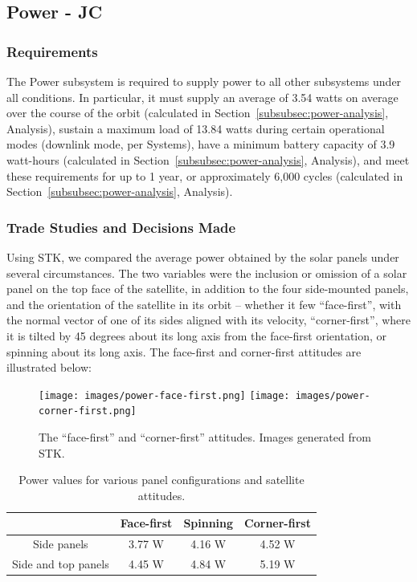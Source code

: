\documentclass[12pt]{article}
\begin{document}
			
		\subsection{Power - JC}
			\subsubsection{Requirements}
			The Power subsystem is required to supply power to all other subsystems under all conditions.  In particular, it must supply an average of 3.54 watts on average over the course of the orbit (calculated in Section~\ref{subsubsec:power-analysis}, Analysis), sustain a maximum load of 13.84 watts during certain operational modes (downlink mode, per Systems), have a minimum battery capacity of 3.9 watt-hours (calculated in Section~\ref{subsubsec:power-analysis}, Analysis), and meet these requirements for up to 1 year, or approximately 6,000 cycles (calculated in Section~\ref{subsubsec:power-analysis}, Analysis).
			
			\subsubsection{Trade Studies and Decisions Made}
			Using STK, we compared the average power obtained by the solar panels under several circumstances.  The two variables were the inclusion or omission of a solar panel on the top face of the satellite, in addition to the four side-mounted panels, and the orientation of the satellite in its orbit -- whether it few ``face-first'', with the normal vector of one of its sides aligned with its velocity, ``corner-first'', where it is tilted by 45 degrees about its long axis from the face-first orientation, or spinning about its long axis.  The face-first and corner-first attitudes are illustrated below:
			
			\begin{figure}[ht]%
			\centering
			\texttt{[image: images/power-face-first.png]}%
			\hspace{0.5in}
			\texttt{[image: images/power-corner-first.png]}
			\caption{The ``face-first'' and ``corner-first'' attitudes.  Images generated from STK.}%
			\label{fig:power-face-first}%
			\end{figure}
			
			\begin{table}[ht]\label{table:power-trade-study}
\caption{Power values for various panel configurations and satellite attitudes.}
\begin{center}
    \begin{tabular}{|c|c|c|c|} \hline
    	 & Face-first & Spinning & Corner-first \\ \hline
Side panels & 3.77 W & 4.16 W & 4.52 W \\\hline
Side and top panels & 4.45 W & 4.84 W & 5.19 W \\\hline
    \end{tabular}
\end{center}
\end{table}
\end{document}
